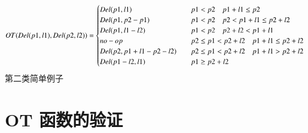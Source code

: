 \begin{equation}
OT(Del(p1,l1),Del(p2,l2))= \begin{cases}
Del(p1,l1) \quad & p1<p2 \quad p1+l1 \le p2 \\
Del(p1,p2-p1) \quad & p1<p2 \quad p2<p1+l1 \le p2+l2\\
Del(p1,l1-l2) \quad & p1<p2 \quad p2+l2<p1+l1\\
no-op \quad & p2 \le p1 < p2+l2 \quad p1+l1 \le p2+l2\\
Del(p2,p1+l1-p2-l2) \quad & p2 \le p1 <p2+l2 \quad  p1+l1>p2+l2\\
Del(p1-l2,l1) \quad & p1 \ge p2+l2  \end{cases}\\
\end{equation}
第二类简单例子

\section{OT 函数的验证}

	